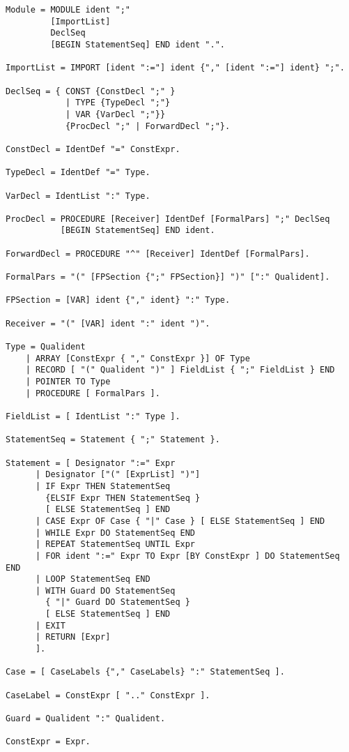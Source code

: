 \documentclass[12pt]{article}
\begin{document}
{\scriptsize
\begin{lstlisting}[style=EBNF]
Module = MODULE ident ";" 
         [ImportList] 
         DeclSeq 
         [BEGIN StatementSeq] END ident ".".

ImportList = IMPORT [ident ":="] ident {"," [ident ":="] ident} ";".

DeclSeq = { CONST {ConstDecl ";" } 
            | TYPE {TypeDecl ";"} 
            | VAR {VarDecl ";"}} 
            {ProcDecl ";" | ForwardDecl ";"}.

ConstDecl = IdentDef "=" ConstExpr.

TypeDecl = IdentDef "=" Type.

VarDecl = IdentList ":" Type.

ProcDecl = PROCEDURE [Receiver] IdentDef [FormalPars] ";" DeclSeq 
           [BEGIN StatementSeq] END ident.

ForwardDecl = PROCEDURE "^" [Receiver] IdentDef [FormalPars].

FormalPars = "(" [FPSection {";" FPSection}] ")" [":" Qualident].

FPSection = [VAR] ident {"," ident} ":" Type.

Receiver = "(" [VAR] ident ":" ident ")".

Type = Qualident
    | ARRAY [ConstExpr { "," ConstExpr }] OF Type
    | RECORD [ "(" Qualident ")" ] FieldList { ";" FieldList } END 
    | POINTER TO Type
    | PROCEDURE [ FormalPars ].

FieldList = [ IdentList ":" Type ].
    
StatementSeq = Statement { ";" Statement }.

Statement = [ Designator ":=" Expr
      | Designator ["(" [ExprList] ")"]
      | IF Expr THEN StatementSeq 
        {ELSIF Expr THEN StatementSeq } 
        [ ELSE StatementSeq ] END
      | CASE Expr OF Case { "|" Case } [ ELSE StatementSeq ] END
      | WHILE Expr DO StatementSeq END
      | REPEAT StatementSeq UNTIL Expr
      | FOR ident ":=" Expr TO Expr [BY ConstExpr ] DO StatementSeq END
      | LOOP StatementSeq END
      | WITH Guard DO StatementSeq 
        { "|" Guard DO StatementSeq } 
        [ ELSE StatementSeq ] END
      | EXIT
      | RETURN [Expr] 
      ].

Case = [ CaseLabels {"," CaseLabels} ":" StatementSeq ].

CaseLabel = ConstExpr [ ".." ConstExpr ].

Guard = Qualident ":" Qualident.

ConstExpr = Expr.


\end{lstlisting}}
\end{document}
